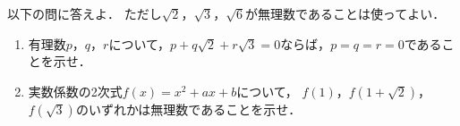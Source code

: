 \documentclass[../../main.tex]{subfiles}
\begin{document}
以下の問に答えよ．
ただし$\sqrt2$，$\sqrt3$，$\sqrt6$が無理数であることは使ってよい．
\begin{enumerate}
  \item 有理数$p$，$q$，$r$について，$p+q\sqrt2+r\sqrt3=0$ならば，$p=q=r=0$であることを示せ．
  \item 実数係数の2次式$f(x)=x^2+ax+b$について，
    $f(1)$，$f(1+\sqrt2)$，$f(\sqrt3)$のいずれかは無理数であることを示せ．
\end{enumerate}
\end{document}
